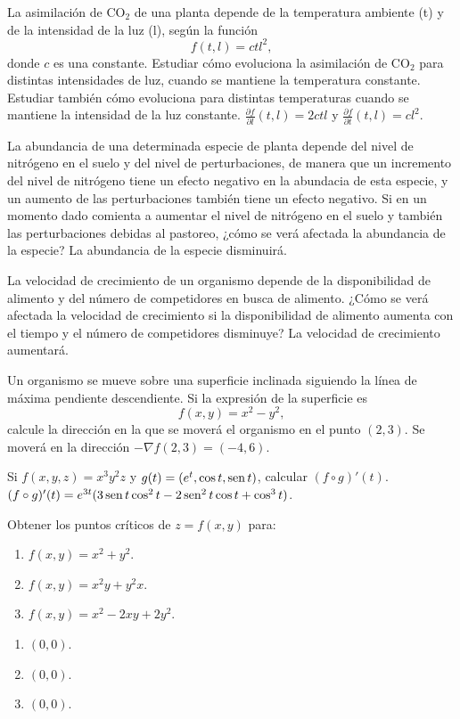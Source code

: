 {La asimilación de CO$_2$ de una planta depende de la temperatura ambiente (t) y de la intensidad de la luz (l), según la función 
\[
f(t,l) = ctl^2,
\]
donde $c$ es una constante. 
Estudiar cómo evoluciona la asimilación de CO$_2$ para distintas intensidades de luz, cuando se mantiene la temperatura constante. 
Estudiar también cómo evoluciona para distintas temperaturas cuando se mantiene la intensidad de la luz constante.   
}
{$\frac{\partial f}{\partial l}(t,l) = 2ctl$ y $\frac{\partial f}{\partial t}(t,l) = cl^2$.
}
{
}


{La abundancia de una determinada especie de planta depende del nivel de nitrógeno en el suelo y del nivel de perturbaciones, de manera que un incremento del nivel de nitrógeno tiene un efecto negativo en la abundacia de esta especie, y un aumento de las perturbaciones también tiene un efecto negativo.
Si en un momento dado comienta a aumentar el nivel de nitrógeno en el suelo y también las perturbaciones debidas al pastoreo, ¿cómo se verá afectada la abundancia de la especie?
}
{La abundancia de la especie disminuirá.
}
{
}


{La velocidad de crecimiento de un organismo depende de la disponibilidad de alimento y del número de competidores en busca de alimento. 
¿Cómo se verá afectada la velocidad de crecimiento si la disponibilidad de alimento aumenta con el tiempo y el número de competidores disminuye?}
{La velocidad de crecimiento aumentará. 
}
{
}


{Un organismo se mueve sobre una superficie inclinada siguiendo la línea de máxima pendiente descendiente. 
Si la expresión de la superficie es 
\[
f(x,y) = x^2-y^2,
\]
calcule la dirección en la que se moverá el organismo en el punto $(2,3)$.
}
{Se moverá en la dirección $-\nabla f(2,3)=(-4,6)$.}
{
}


{Si $f(x,y,z)=x^3y^2z$ y $g(t)=(e^t,\cos t,\operatorname{sen} t)$, calcular $(f\circ g)'(t)$.
}
{$(f\circ g)'(t)= e^{3t}(3\operatorname{sen} t\cos^2 t-2\operatorname{sen}^2 t\cos t+\cos^3 t)$.
}
{
}


{Obtener los puntos críticos de $z=f(x,y)$ para:
\begin{enumerate}
\item $f(x,y)=x^2+y^2$.
\item $f(x,y)=x^2y+y^2x$.
\item $f(x,y)=x^2-2xy+2y^2$.
\end{enumerate}
}
{\begin{enumerate}
\item $(0,0)$.
\item $(0,0)$.
\item $(0,0)$.
\end{enumerate}
}
{
}


